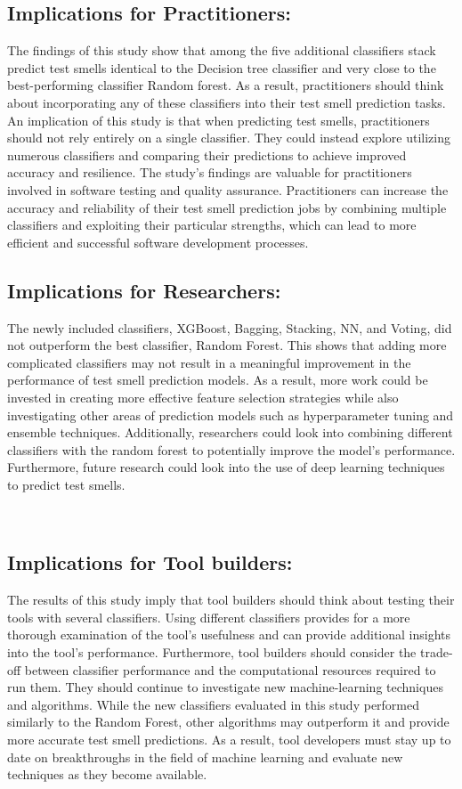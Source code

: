 \documentclass[sigconf,review]{acmart}
\begin{document}
\subsection{Implications for Practitioners:}
\label{subsection:1}
The findings of this study show that among the five additional classifiers stack predict test smells identical to the Decision tree classifier and very close to the best-performing classifier Random forest. As a result, practitioners should think about incorporating any of these classifiers into their test smell prediction tasks. An implication of this study is that when predicting test smells, practitioners should not rely entirely on a single classifier. They could instead explore utilizing numerous classifiers and comparing their predictions to achieve improved accuracy and resilience. The study's findings are valuable for practitioners involved in software testing and quality assurance. Practitioners can increase the accuracy and reliability of their test smell prediction jobs by combining multiple classifiers and exploiting their particular strengths, which can lead to more efficient and successful software development processes.
 \\
\subsection{Implications for Researchers:}
\label{subsection:2}
The newly included classifiers, XGBoost, Bagging, Stacking, NN, and Voting, did not outperform the best classifier, Random Forest. This shows that adding more complicated classifiers may not result in a meaningful improvement in the performance of test smell prediction models. As a result, more work could be invested in creating more effective feature selection strategies while also investigating other areas of prediction models such as hyperparameter tuning and ensemble techniques. Additionally, researchers could look into combining different classifiers with the random forest to potentially improve the model's performance. Furthermore, future research could look into the use of deep learning techniques to predict test smells.

\\
\subsection{Implications for Tool builders:}
\label{subsection:3}
The results of this study imply that tool builders should think about testing their tools with several classifiers. Using different classifiers provides for a more thorough examination of the tool's usefulness and can provide additional insights into the tool's performance. Furthermore, tool builders should consider the trade-off between classifier performance and the computational resources required to run them. They should continue to investigate new machine-learning techniques and algorithms. While the new classifiers evaluated in this study performed similarly to the Random Forest, other algorithms may outperform it and provide more accurate test smell predictions. As a result, tool developers must stay up to date on breakthroughs in the field of machine learning and evaluate new techniques as they become available. 
\end{document}
